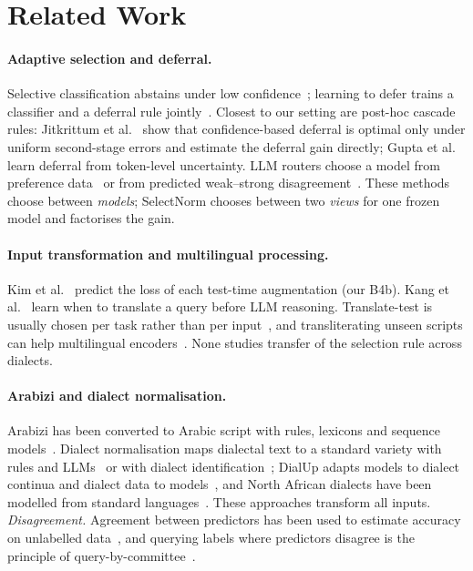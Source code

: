 \section{Related Work}
\label{sec:related}

\paragraph{Adaptive selection and deferral.}
Selective classification abstains under low confidence~\cite{geifman2017selective,geifman2019selectivenet}; learning to defer trains a classifier and a deferral rule jointly~\cite{mozannar2020defer}. Closest to our setting are post-hoc cascade rules: Jitkrittum et al.~\cite{jitkrittum2023cascade} show that confidence-based deferral is optimal only under uniform second-stage errors and estimate the deferral gain directly; Gupta et al.~\cite{gupta2024cascades} learn deferral from token-level uncertainty. LLM routers choose a model from preference data~\cite{ong2025routellm} or from predicted weak--strong disagreement~\cite{noorani2026disagreement}. These methods choose between \emph{models}; SelectNorm chooses between two \emph{views} for one frozen model and factorises the gain.

\paragraph{Input transformation and multilingual processing.}
Kim et al.~\cite{kim2020learningloss} predict the loss of each test-time augmentation (our B4b). Kang et al.~\cite{kang2026luar} learn when to translate a query before LLM reasoning. Translate-test is usually chosen per task rather than per input~\cite{artetxe2023revisiting}, and transliterating unseen scripts can help multilingual encoders~\cite{muller2021unseen,moosa2023transliteration}. None studies transfer of the selection rule across dialects.

\paragraph{Arabizi and dialect normalisation.}
Arabizi has been converted to Arabic script with rules, lexicons and sequence models~\cite{darwish2014arabizi,shazal2020unified}. Dialect normalisation maps dialectal text to a standard variety with rules and LLMs~\cite{dimakis2025dialect} or with dialect identification~\cite{alhafni2024exploiting}; DialUp adapts models to dialect continua and dialect data to models~\cite{bafna2025dialup}, and North African dialects have been modelled from standard languages~\cite{toughrai2025modeling}. These approaches transform all inputs.
\emph{Disagreement.} Agreement between predictors has been used to estimate accuracy on unlabelled data~\cite{platanios2014estimating,garg2022atc}, and querying labels where predictors disagree is the principle of query-by-committee~\cite{seung1992qbc}.
